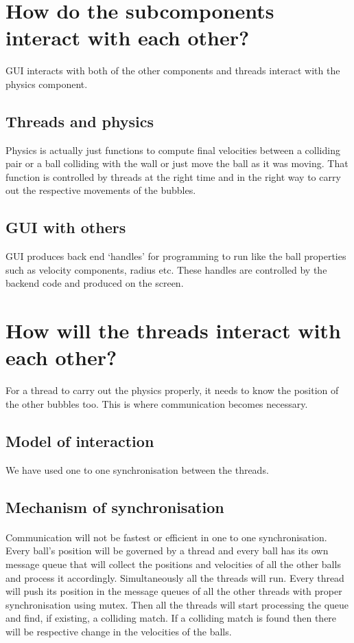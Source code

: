 \documentclass{article}
\begin{document}
	\section{How do the subcomponents interact with each other?}
	GUI interacts with both of the other components and threads interact with the physics component.
	\subsection{Threads and physics}
	Physics is actually just functions to compute final velocities between a colliding pair or a ball colliding with the wall or just move the ball as it was moving. That function is controlled by threads at the right time and in the right way to carry out the respective movements of the bubbles. 
	\subsection{GUI with others}
	GUI produces back end `handles' for programming to run like the ball properties such as velocity components, radius etc.
These handles are controlled by the backend code and produced on the screen.
	\section{How will the threads interact with each other?}
	For a thread to carry out the physics properly, it needs to know the position of the other bubbles too. This is where communication becomes necessary.
	\subsection{Model of interaction}
	We have used one to one synchronisation between the threads.
	\subsection{Mechanism of synchronisation}
	
	\paragraph{}
	Communication will not be fastest or efficient in one to one synchronisation. Every ball's position will be governed by a thread and every ball has its own message queue that will collect the positions and velocities of all the other balls and process it accordingly. 
	\newline
	Simultaneously all the threads will run. Every thread will push its position in the message queues of all the other threads with proper synchronisation using mutex. Then all the threads will start processing the queue and find, if existing, a colliding match. If a colliding match is found then there will be respective change in the velocities of the balls.
\end{document}
